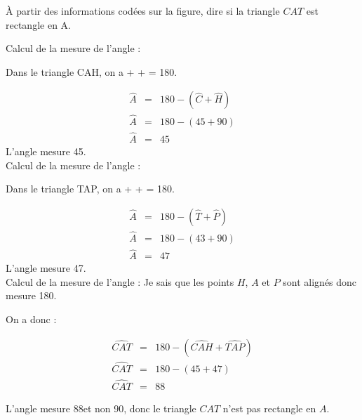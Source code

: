 	\begin{questions}
		\question \`A partir des informations codées sur la figure, dire si la triangle $CAT$ est rectangle en A.
	\end{questions}
	\begin{solution}
		Calcul de la mesure de l'angle  :
		
		Dans le triangle CAH, on a  +  +  = 180\degree.
		
			\begin{eqnarray*}
				\widehat{A}  &=& 180 - (\widehat{C} + \widehat{H}) \\
				\widehat{A}  &=& 180 - (45 + 90) \\
				\widehat{A}  &=& 45
			\end{eqnarray*}
		L'angle  mesure 45\degree.\\
		
		
		
		Calcul de la mesure de l'angle  :
		
		Dans le triangle TAP, on a  +  +  = 180\degree.
		
		\begin{eqnarray*}
			\widehat{A}  &=& 180 - (\widehat{T} + \widehat{P}) \\
			\widehat{A}  &=& 180 - (43 + 90) \\
			\widehat{A}  &=& 47
		\end{eqnarray*}
		L'angle  mesure 47\degree.\\
		
		Calcul de la mesure de l'angle  :
		Je sais que les points $H$, $A$ et $P$ sont alignés donc  mesure 180\degree.
		
		On a donc :
		
		\begin{eqnarray*}
			\widehat{CAT}  &=& 180 - (\widehat{CAH} + \widehat{TAP}) \\
			\widehat{CAT}  &=& 180 - (45 + 47) \\
			\widehat{CAT}  &=& 88
		\end{eqnarray*}
	
		L'angle  mesure 88\degree et non 90\degree, donc le triangle $CAT$ n'est pas rectangle en $A$.
	\end{solution}



	
